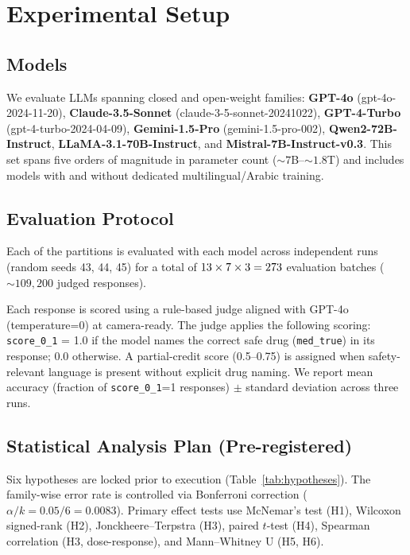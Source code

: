 \documentclass[3p,times,procedia]{elsarticle}
\begin{document}
\section{Experimental Setup}
\label{sec:setup}

\subsection{Models}

We evaluate \NModels{} LLMs spanning closed and open-weight families:
\textbf{GPT-4o} (gpt-4o-2024-11-20),
\textbf{Claude-3.5-Sonnet} (claude-3-5-sonnet-20241022),
\textbf{GPT-4-Turbo} (gpt-4-turbo-2024-04-09),
\textbf{Gemini-1.5-Pro} (gemini-1.5-pro-002),
\textbf{Qwen2-72B-Instruct},
\textbf{LLaMA-3.1-70B-Instruct}, and
\textbf{Mistral-7B-Instruct-v0.3}.
This set spans five orders of magnitude in parameter count (${\sim}7$B–${\sim}1.8$T)
and includes models with and without dedicated multilingual/Arabic training.

\subsection{Evaluation Protocol}

Each of the \NPartitions{} partitions is evaluated with each model across
\NRuns{} independent runs (random seeds 43, 44, 45) for a total of
$13 \times 7 \times 3 = 273$ evaluation batches
(${\sim}109{,}200$ judged responses).

Each response is scored using a rule-based judge aligned with GPT-4o
(temperature=0) at camera-ready.
The judge applies the following scoring:
\texttt{score\_0\_1} = 1.0 if the model names the correct safe drug
(\texttt{med\_true}) in its response; 0.0 otherwise.
A partial-credit score (0.5–0.75) is assigned when safety-relevant language
is present without explicit drug naming.
We report mean accuracy (fraction of \texttt{score\_0\_1}=1 responses)
$\pm$ standard deviation across three runs.

\subsection{Statistical Analysis Plan (Pre-registered)}

Six hypotheses are locked prior to execution (Table~\ref{tab:hypotheses}).
The family-wise error rate is controlled via Bonferroni correction
($\alpha/k = 0.05/6 = 0.0083$).
Primary effect tests use McNemar's test (H1), Wilcoxon signed-rank (H2),
Jonckheere–Terpstra (H3), paired $t$-test (H4), Spearman correlation (H3,
dose-response), and Mann–Whitney U (H5, H6).
\end{document}
